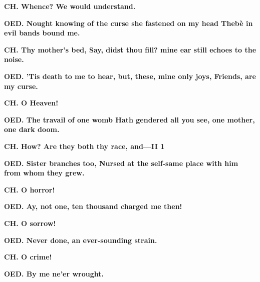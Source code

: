 \documentclass[11pt,letter]{book}
\begin{document}
\par \textbf{CH. Whence? We would understand.}
\par 

\par \textbf{OED. Nought knowing of the curse she fastened on my head Thebè in evil bands bound me.}
\par 

\par \textbf{CH. Thy mother’s bed, Say, didst thou fill? mine ear still echoes to the noise.}
\par 

\par \textbf{OED. ’Tis death to me to hear, but, these, mine only joys, Friends, are my curse.}
\par 

\par \textbf{CH. O Heaven!}
\par 

\par \textbf{OED. The travail of one womb Hath gendered all you see, one mother, one dark doom.}
\par 

\par \textbf{CH. How? Are they both thy race, and—II 1}
\par 

\par \textbf{OED. Sister branches too, Nursed at the self-same place with him from whom they grew.}
\par 

\par \textbf{CH. O horror!}
\par 

\par \textbf{OED. Ay, not one, ten thousand charged me then!}
\par 

\par \textbf{CH. O sorrow!}
\par 

\par \textbf{OED. Never done, an ever-sounding strain.}
\par 

\par \textbf{CH. O crime!}
\par 

\par \textbf{OED. By me ne’er wrought.}
\par 
\end{document}
